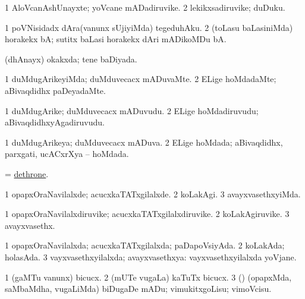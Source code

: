 \bentry
{} 
\gl{\nA}
\expl{}
\bmng
\bnum
\num{1} AloVcanAshUnayxte; yoVcane mADadiruvike. 
\num{2} lekikxsadiruvike; duDuku. 
\enum
\emng
\eentry

\bentry
{} 
\gl{\sakirx}
\expl{}
\bmng
\bnum
\num{1} poVNisidadx dAra(vanunx sUjiyiMda) tegeduhAku. 
\num{2} (toLasu baLasiniMda) horakekx bA; sutitx baLasi horakekx dAri mADikoMDu bA. 
\enum
\emng
\eentry

\bentry
{} 
\gl{\gu}
\expl{}
\bmng
(dhAnayx) okakxda; tene baDiyada. 
\emng
\eentry

\bentry
{} 
\gl{\kirxvi}
\bmng
\bnum
\num{1} duMdugArikeyiMda; duMduvecacx mADuvaMte. 
\num{2} ELige hoMdadaMte; aBivaqdidhx paDeyadaMte. 
\enum
\emng
\eentry

\bentry
{} 
\gl{\nA}
\expl{}
\bmng
\bnum
\num{1} duMdugArike; duMduvecacx mADuvudu. 
\num{2} ELige hoMdadiruvudu; aBivaqdidhxyAgadiruvudu. 
\enum
\emng
\eentry

\bentry
{} 
\gl{\gu}
\expl{}
\bmng
\bnum
\num{1} duMdugArikeya; duMduvecacx mADuva. 
\num{2} ELige hoMdada; aBivaqdidhx, parxgati, ucACxrXya -- hoMdada. 
\enum
\emng
\eentry

\bentry
{} 
\gl{\sakirx}
\expl{}
\bmng
= \hyperref{kandict_d.pdf}{D}{dethrone}{dethrone}. 
\emng
\eentry

\bentry
{} 
\gl{\kirxvi}
\bmng
\bnum
\num{1} opapxOraNavilalxde; acucxkaTATxgilalxde. 
\num{2} koLakAgi. 
\num{3} avayxvasethxyiMda. 
\enum
\emng
\eentry

\bentry
{} 
\gl{\nA}
\expl{}
\bmng
\bnum
\num{1} opapxOraNavilalxdiruvike; acucxkaTATxgilalxdiruvike. 
\num{2} koLakAgiruvike. 
\num{3} avayxvasethx. 
\enum
\emng
\eentry

\bentry
{} 
\gl{\gu}
\bmng
\bnum
\num{1} opapxOraNavilalxda; acucxkaTATxgilalxda; paDapoVsiyAda. 
\num{2} koLakAda; holasAda. 
\num{3} vayxvasethxyilalxda; avayxvasethxya:  vayxvasethxyilalxda yoVjane. 
\enum
\emng
\eentry

\bentry
{} 
\gl{\akirx}
\bmng
\bnum
\num{1} (gaMTu \mo vanunx) bicucx. 
\num{2} (mUTe \mo vugaLa) kaTuTx bicucx. 
\num{3} (\rUpa) (opapxMda, saMbaMdha, \mo vugaLiMda) biDugaDe mADu; vimukitxgoLisu; vimoVcisu. 
\enum
\emng
\eentry

